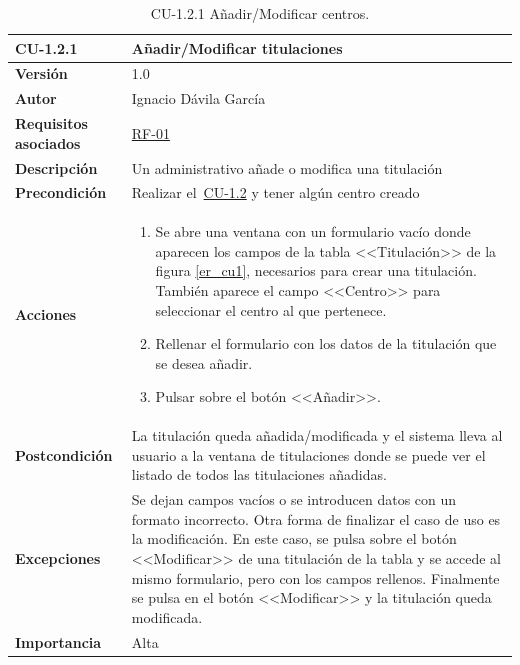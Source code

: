 \begin{table}[p]
\label{table:CU-1.2.1}
	\centering
	\begin{tabularx}{\linewidth}{ p{} p{} }
		\toprule
		\textbf{CU-1.2.1}    & \textbf{Añadir/Modificar titulaciones}\\
		\toprule
		\textbf{Versión}              & 1.0    \\
		\textbf{Autor}                & Ignacio Dávila García \\
		\textbf{Requisitos asociados} & \hyperref[itm:RF1]{RF-01} \\
		\textbf{Descripción}          & Un administrativo añade o modifica una titulación \\
		\textbf{Precondición}         & Realizar el~\hyperref[table:CU-1.2]{CU-1.2} y tener algún centro creado \\
		\textbf{Acciones}             &
		\begin{enumerate}
			\def\labelenumi{\arabic{enumi}.}
			\tightlist
			\item Se abre una ventana con un formulario vacío donde aparecen los campos de la tabla <<Titulación>> de la figura \ref{er_cu1}, necesarios para crear una titulación. También aparece el campo <<Centro>> para seleccionar el centro al que pertenece.
			\item Rellenar el formulario con los datos de la titulación que se desea añadir.
			\item Pulsar sobre el botón <<Añadir>>.
		\end{enumerate}\\
		\textbf{Postcondición}        & La titulación queda añadida/modificada y el sistema lleva al usuario a la ventana de titulaciones donde se puede ver el listado de todos las titulaciones añadidas. \\
		\textbf{Excepciones}          & Se dejan campos vacíos o se introducen datos con un formato incorrecto. Otra forma de finalizar el caso de uso es la modificación. En este caso, se pulsa sobre el botón <<Modificar>> de una titulación de la tabla y se accede al mismo formulario, pero con los campos rellenos. Finalmente se pulsa en el botón <<Modificar>> y la titulación queda modificada. \\
		\textbf{Importancia}          & Alta \\
		\bottomrule
	\end{tabularx}
	\caption{CU-1.2.1 Añadir/Modificar centros.}
\end{table}
\FloatBarrier

